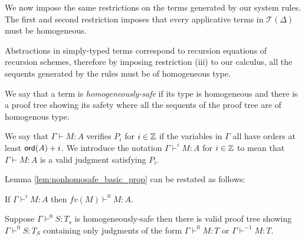 We now impose the same restrictions on the terms generated by our system rules.
The first and second restriction imposes that every applicative terms in $\mathcal{T}(\Delta)$ must be homogeneous.

Abstractions in simply-typed terms correspond to recursion equations of recursion schemes,
therefore by imposing restriction (iii) to our calculus, all the sequents generated by the rules must be of homogeneous type.

We say that a term is \emph{homogeneously-safe} if its type is homogeneous
and there is a proof tree showing its safety where all the sequents
of the proof tree are of homogenous type.

We say that $\Gamma \vdash M : A$ verifies $P_i$ for $i \in \mathbb{Z}$ if the
variables in $\Gamma$ all have orders at least ${\sf ord}(A)+i$. We introduce the notation $\Gamma \vdash^{i} M : A$ for $i \in
\mathbb{Z}$ to mean that $\Gamma \vdash M : A$ is a valid judgment satisfying $P_i$.

Lemma \ref{lem:nonhomosafe_basic_prop} can be restated as follows:

\begin{lem}
\label{lem:context_reduction} If $\Gamma \vdash^i M : A$ then  $fv(M) \vdash^0 M : A$.
\end{lem}


\begin{lem}
\label{lem:homog_judg_zero_minusone} Suppose $\Gamma \vdash^0 S : T_s$ is homogeneously-safe
then there is valid proof tree showing $\Gamma \vdash^0 S : T_S$ containing
only judgments of the form $\Gamma \vdash^0 M : T$ or $\Gamma \vdash^{-1} M : T$.
\end{lem}

